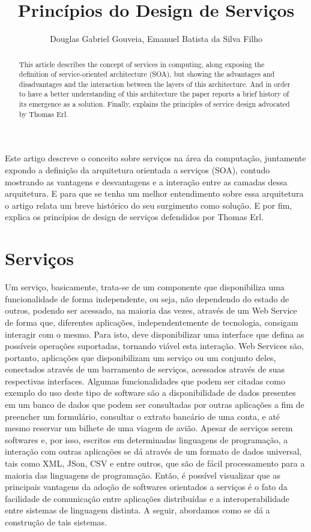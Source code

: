 \documentclass[12pt]{article}
\title{Princípios do Design de Serviços}
\author{Douglas Gabriel Gouveia\inst{1}, Emanuel Batista da Silva Filho\inst{2} }
\begin{document}
 

\maketitle

\begin{abstract}
This article describes the concept of services in computing, along exposing the definition of service-oriented architecture (SOA), but showing the advantages and disadvantages and the interaction between the layers of this architecture. And in order to have a better understanding of this architecture the paper reports a brief history of its emergence as a solution. Finally, explains the principles of service design advocated by Thomas Erl.   
\end{abstract}
   
\begin{resumo} 
Este artigo descreve o conceito sobre serviços na área da computação, juntamente expondo a definição da arquitetura orientada a serviços (SOA), contudo mostrando as vantagens e desvantagens e a interação entre as camadas dessa arquitetura. E para que se tenha um melhor entendimento sobre essa arquitetura o artigo relata um breve histórico do seu surgimento como solução. E por fim, explica os princípios de design de serviços defendidos  por Thomas Erl.
\end{resumo}


\section{Serviços}

Um serviço, basicamente, trata-se de um componente que disponibiliza uma funcionalidade de forma independente, ou seja, não dependendo do estado de outros, podendo ser acessado, na maioria das vezes, através de um Web Service de forma que, diferentes aplicações, independentemente de tecnologia, consigam interagir com o mesmo. Para isto, deve disponibilizar uma interface que defina as possíveis operações suportadas, tornando viável esta interação.
Web Services são, portanto, aplicações que disponibilizam um serviço ou um conjunto deles, conectados através de um barramento de serviços, acessados através de suas respectivas interfaces.
Algumas funcionalidades que podem ser citadas como exemplo do uso deste tipo de software são a disponibilidade de dados presentes em um banco de dados que podem ser consultadas por outras aplicações a fim de preencher um formulário, consultar o extrato bancário de uma conta, e até mesmo reservar um bilhete de uma viagem de avião.
Apesar de serviços serem softwares e, por isso, escritos em determinadas linguagens de programação, a interação com outras aplicações se dá através de um formato de dados universal, tais como XML, JSon, CSV e entre outros, que são de fácil processamento para a maioria das linguagens de programação.
Então, é possível visualizar que as principais vantagens da adoção de softwares orientados a serviços é o fato da facilidade de comunicação entre aplicações distribuídas e a interoperabilidade entre sistemas de linguagem distinta. A seguir, abordamos como se dá a construção de tais sistemas.
\end{document}
